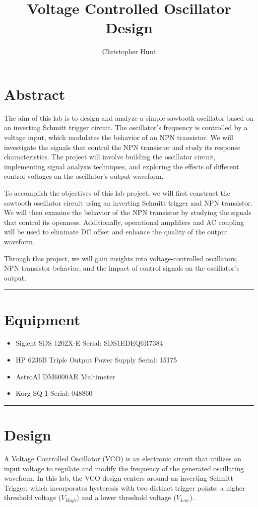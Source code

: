 \documentclass{article}
\title{\textbf{{\huge Voltage Controlled Oscillator Design}}}
\author{Christopher Hunt}
\date{}
\begin{document}
\pagestyle{fancy}
\fancyhf{}
\rhead{\thepage}
\maketitle
\section*{\textcolor{mycolor}{Abstract}}
The aim of this lab is to design and analyze a simple sawtooth oscillator based on an inverting Schmitt trigger circuit. The oscillator's frequency is controlled by a voltage input, which modulates the behavior of an NPN transistor. We will investigate the signals that control the NPN transistor and study its response characteristics. The project will involve building the oscillator circuit, implementing signal analysis techniques, and exploring the effects of different control voltages on the oscillator's output waveform.

To accomplish the objectives of this lab project, we will first construct the sawtooth oscillator circuit using an inverting Schmitt trigger and NPN transistor. We will then examine the behavior of the NPN transistor by studying the signals that control its openness. Additionally, operational amplifiers and AC coupling will be used to eliminate DC offset and enhance the quality of the output waveform.

Through this project, we will gain insights into voltage-controlled oscillators, NPN transistor behavior, and the impact of control signals on the oscillator's output.
\vspace{5mm}
\hrule

\section*{\textcolor{mycolor}{Equipment}}
\begin{itemize}
  \item Siglent SDS 1202X-E Serial: SDS1EDEQ6R7384
  \item HP 6236B Triple Output Power Supply Serial: 15175
  \item AstroAI DM6000AR Multimeter
  \item Korg SQ-1 Serial: 048860
\end{itemize}
\vspace{5mm}
\hrule

\section*{\textcolor{mycolor}{Design}}
A Voltage Controlled Oscillator (VCO) is an electronic circuit that utilizes an input voltage to regulate and modify the frequency of the generated oscillating waveform. In this lab, the VCO design centers around an inverting Schmitt Trigger, which incorporates hysteresis with two distinct trigger points: a higher threshold voltage ($V_{High}$) and a lower threshold voltage ($V_{Low}$).
\end{document}
